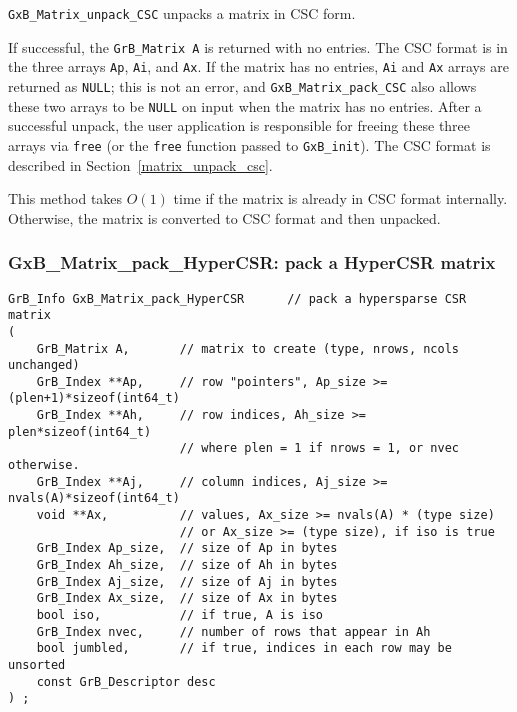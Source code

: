 \documentclass[12pt]{article}
\begin{document}
\verb'GxB_Matrix_unpack_CSC' unpacks a matrix in CSC form.

If successful, the \verb'GrB_Matrix A' is returned with no entries.
The CSC format is in the three arrays
\verb'Ap', \verb'Ai', and \verb'Ax'.  If the matrix has no entries, \verb'Ai'
and \verb'Ax' arrays are returned as \verb'NULL'; this is not an error, and
\verb'GxB_Matrix_pack_CSC' also allows these two arrays to be \verb'NULL' on
input when the matrix has no entries.  After a successful unpack, the user
application is responsible for freeing these three arrays via \verb'free' (or
the \verb'free' function passed to \verb'GxB_init').  The CSC format is
described in Section~\ref{matrix_unpack_csc}.

This method takes $O(1)$ time if the matrix is already in CSC format
internally.  Otherwise, the matrix is converted to CSC format and then
unpacked.


\newpage
\subsubsection{{\sf GxB\_Matrix\_pack\_HyperCSR:} pack a HyperCSR matrix}
\label{matrix_pack_hypercsr}

\begin{mdframed}[userdefinedwidth=6in]
{\footnotesize
\begin{verbatim}
GrB_Info GxB_Matrix_pack_HyperCSR      // pack a hypersparse CSR matrix
(
    GrB_Matrix A,       // matrix to create (type, nrows, ncols unchanged)
    GrB_Index **Ap,     // row "pointers", Ap_size >= (plen+1)*sizeof(int64_t)
    GrB_Index **Ah,     // row indices, Ah_size >= plen*sizeof(int64_t)
                        // where plen = 1 if nrows = 1, or nvec otherwise.
    GrB_Index **Aj,     // column indices, Aj_size >= nvals(A)*sizeof(int64_t)
    void **Ax,          // values, Ax_size >= nvals(A) * (type size)
                        // or Ax_size >= (type size), if iso is true
    GrB_Index Ap_size,  // size of Ap in bytes
    GrB_Index Ah_size,  // size of Ah in bytes
    GrB_Index Aj_size,  // size of Aj in bytes
    GrB_Index Ax_size,  // size of Ax in bytes
    bool iso,           // if true, A is iso
    GrB_Index nvec,     // number of rows that appear in Ah
    bool jumbled,       // if true, indices in each row may be unsorted
    const GrB_Descriptor desc
) ;
\end{verbatim}
} \end{mdframed}
\end{document}
